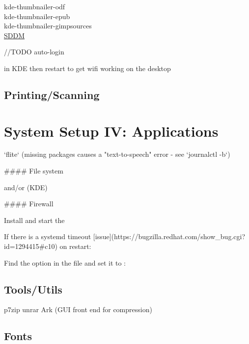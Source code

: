 
kde-thumbnailer-odf\\
kde-thumbnailer-epub\\
kde-thumbnailer-gimpsources\\


\href{https://wiki.archlinux.org/index.php/SDDM}{SDDM}

//TODO auto-login

 in KDE then restart to get wifi working on the desktop


\subsection{Printing/Scanning}



\section{System Setup IV: Applications}

`flite` (missing packages causes a "text-to-speech" error - see `journalctl -b`)


#### File system

 and/or  (KDE)

#### Firewall

Install  and start the 

If there is a systemd timeout [issue](https://bugzilla.redhat.com/show_bug.cgi?id=1294415#c10) on restart: 
\begin{blocksection}
    Find the  option in the file and set it to :\\
\end{blocksection}

\subsection{Tools/Utils}

p7zip
unrar
Ark (GUI front end for compression)

\subsection{Fonts}

